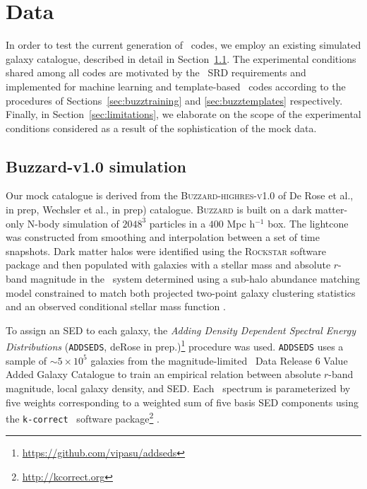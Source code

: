 \section{Data}
\label{sec:sims}

In order to test the current generation of \pzpdf\ codes, we employ an existing simulated galaxy catalogue, described in detail in Section~\ref{sec:buzzard}.
The experimental conditions shared among all codes are motivated by the \lsst\ SRD requirements and implemented for machine learning and template-based \pzpdf\ codes according to the procedures of Sections~\ref{sec:buzztraining} and \ref{sec:buzztemplates} respectively.
Finally, in Section~\ref{sec:limitations}, we elaborate on the scope of the experimental conditions considered as a result of the sophistication of the mock data.

\subsection{Buzzard-v1.0 simulation}
\label{sec:buzzard}

Our mock catalogue is derived from the \textsc{Buzzard-highres-v1.0}  of De Rose et al., in prep, Wechsler et al., in prep) catalogue.
\textsc{Buzzard} is built on a dark matter-only N-body simulation of $2048^{3}$ particles in a $400$ Mpc h$^{-1}$ box.
The lightcone was constructed from smoothing and interpolation between a set of time snapshots.
Dark matter halos were identified using the \textsc{Rockstar} software package \citep{Behroozi:13} and then populated with galaxies with a stellar mass and absolute $r$-band magnitude in the \sdss\ system determined using a sub-halo abundance matching model constrained to match both projected two-point galaxy clustering statistics and an observed conditional stellar mass function \citep{Reddick:13}.

To assign an SED to each galaxy, the {\it Adding Density Dependent Spectral Energy Distributions} (\texttt{ADDSEDS}, deRose in prep.)\footnote{\url{https://github.com/vipasu/addseds}} procedure was used.
\texttt{ADDSEDS} uses a sample of $\sim 5\times 10^{5}$ galaxies from the magnitude-limited \sdss\ Data Release 6 Value Added Galaxy Catalogue \citep{Blanton:05} to train an empirical relation between absolute $r$-band magnitude, local galaxy density, and SED.
Each \sdss\ spectrum is parameterized by five weights corresponding to a weighted sum of five basis SED components using the \texttt{k-correct } software package\footnote{\url{http://kcorrect.org}} \citep{Blanton:07}.

